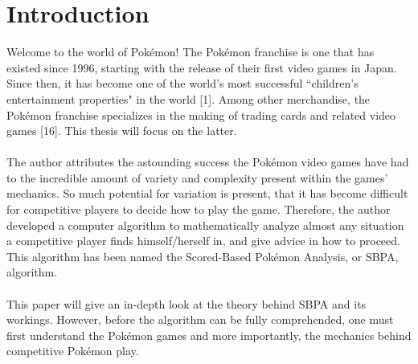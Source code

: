 \documentclass{article}
\begin{document}
\section{Introduction}
Welcome to the world of Pok\'emon! The Pok\'emon franchise is one that has existed since 1996, starting with the release of their first video games in Japan. Since then, it has become one of the world's most successful ``children's entertainment properties" in the world [1]. Among other merchandise, the Pok\'emon franchise specializes in the making of trading cards and related video games [16]. This thesis will focus on the latter.\\\\
The author attributes the astounding success the Pok\'emon video games have had to the incredible amount of variety and complexity present within the games' mechanics. So much potential for variation is present, that it has become difficult for competitive players to decide how to play the game. Therefore, the author developed a computer algorithm to mathematically analyze almost any situation a competitive player finds himself/herself in, and give advice in how to proceed. This algorithm has been named the Scored-Based Pok\'emon Analysis, or SBPA, algorithm.\\\\
This paper will give an in-depth look at the theory behind SBPA and its workings. However, before the algorithm can be fully comprehended, one must first understand the Pok\'emon games and more importantly, the mechanics behind competitive Pok\'emon play.
\end{document}
